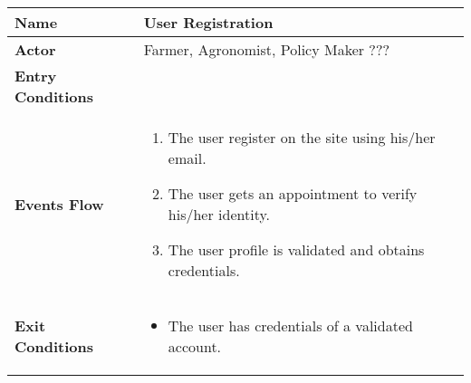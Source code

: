 \begin{center}
\renewcommand{\arraystretch}{1.25}
\begin{tabular}{|l|>{\raggedright\arraybackslash}m{12cm}|}
    \hline
    \textbf{Name} & User Registration\\
    \hline
   	\textbf{Actor} & Farmer, Agronomist, Policy Maker ???\\
    \hline
    \textbf{Entry Conditions} & \\
    \hline
    
    \textbf{Events Flow} & \begin{enumerate}
    			\item The user register on the site using his/her email.
    			\item The user gets an appointment to verify his/her identity.
    			\item The user profile is validated and obtains credentials.
	    		\end{enumerate}
    	\\
    \hline
    \textbf{Exit Conditions} & \begin{itemize}
    	\item The user has credentials of a validated account.
   		\end{itemize} \\
    \hline
\end{tabular}
\end{center}